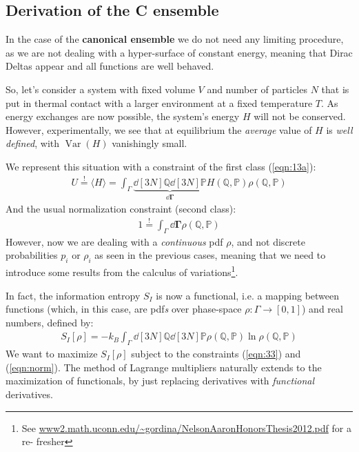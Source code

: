 \documentclass[../template.tex]{subfiles}
\begin{document}
\subsection{Derivation of the C ensemble}
In the case of the \textbf{canonical ensemble} we do not need any limiting procedure, as we are not dealing with a  hyper-surface of constant energy, meaning that Dirac Deltas appear and all functions are well behaved.

\medskip

So, let's consider a system with fixed volume $V$ and number of particles $N$ that is put in thermal contact with a larger environment at a fixed temperature $T$. As energy exchanges are now possible, the system's energy $H$ will not be conserved. However, experimentally, we see that at equilibrium the \textit{average} value of $H$ is \textit{well defined}, with $\operatorname{Var}(H)$ vanishingly small. 

\medskip

We represent this situation with a constraint of the first class (\ref{eqn:13a}):
\begin{align} \label{eqn:33}
    U \overset{!}{=}  \langle H \rangle = \int_\Gamma \underbrace{\dd[3N]{\mathbb{Q}} \dd[3N]{\mathbb{P}}}_{\dd{\bm{\Gamma}}}  H(\mathbb{Q}, \mathbb{P}) \rho(\mathbb{Q}, \mathbb{P})
\end{align}
And the usual normalization constraint (second class):
\begin{align}\label{eqn:norm}
    1 \overset{!}{=} \int_{\Gamma} \dd{\bm{\Gamma}} \rho(\mathbb{Q}, \mathbb{P})
\end{align}
However, now we are dealing with a \textit{continuous} pdf $\rho$, and not discrete probabilities $p_i$ or $\rho_i$ as seen in the previous cases, meaning that we need to introduce some results from the calculus of variations\footnote{See \url{www2.math.uconn.edu/~gordina/NelsonAaronHonorsThesis2012.pdf} for a re-
fresher}.

\medskip

In fact, the information entropy $S_I$ is now a functional, i.e. a mapping between functions (which, in this case, are pdf\textit{s} over phase-space $\rho \colon \Gamma \to [0,1]$) and real numbers, defined by:
\begin{align}
    S_I[\rho] = -k_B \int_{\Gamma} \dd[3N]{\mathbb{Q}} \dd[3N]{\mathbb{P}} \rho(\mathbb{Q}, \mathbb{P}) \ln \rho(\mathbb{Q}, \mathbb{P})
\end{align}
We want to maximize $S_I[\rho]$ subject to the constraints (\ref{eqn:33}) and (\ref{eqn:norm}). The method of Lagrange multipliers naturally extends to the maximization of functionals, by just replacing derivatives with \textit{functional} derivatives.
\end{document}
